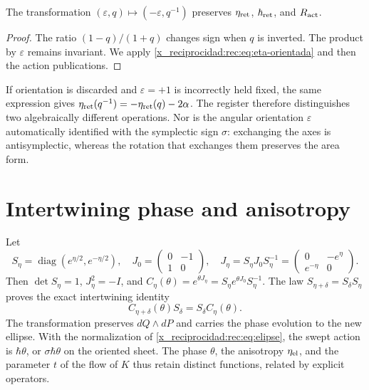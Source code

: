 \begin{corollary}
The transformation \((\varepsilon,q)\mapsto(-\varepsilon,q^{-1})\) preserves \(\eta_{\rm ret}\), \(\hbar_{\rm ret}\), and \(R_{\rm act}\).
\end{corollary}
\begin{proof}
The ratio \((1-q)/(1+q)\) changes sign when \(q\) is inverted. The product by \(\varepsilon\) remains invariant. We apply \eqref{x_reciprocidad:rec:eq:eta-orientada} and then the action publications.
\end{proof}

If orientation is discarded and \(\varepsilon=+1\) is incorrectly held fixed, the same expression gives \(\eta_{\rm ret}(q^{-1})=-\eta_{\rm ret}(q)-2\alpha\). The register therefore distinguishes two algebraically different operations. Nor is the angular orientation \(\varepsilon\) automatically identified with the symplectic sign \(\sigma\): exchanging the axes is antisymplectic, whereas the rotation that exchanges them preserves the area form.

\section{Intertwining phase and anisotropy}

Let
\[
 S_\eta=\operatorname{diag}(e^{\eta/2},e^{-\eta/2}),\quad
 J_0=\begin{pmatrix}0&-1\\1&0\end{pmatrix},\quad
 J_\eta=S_\eta J_0S_\eta^{-1}
       =\begin{pmatrix}0&-e^\eta\\e^{-\eta}&0\end{pmatrix}.
\]
Then \(\det S_\eta=1\), \(J_\eta^2=-I\), and
\(C_\eta(\theta)=e^{\theta J_\eta}=S_\eta e^{\theta J_0}S_\eta^{-1}\).
The law \(S_{\eta+\delta}=S_\delta S_\eta\) proves the exact intertwining identity
\begin{equation}
 C_{\eta+\delta}(\theta)S_\delta=S_\delta C_\eta(\theta).
 \label{x_reciprocidad:rec:eq:entrelazamiento}
\end{equation}
The transformation preserves \(dQ\wedge dP\) and carries the phase evolution to the new ellipse. With the normalization of \eqref{x_reciprocidad:rec:eq:elipse}, the swept action is \(\hbar\theta\), or \(\sigma\hbar\theta\) on the oriented sheet. The phase \(\theta\), the anisotropy \(\eta_{\rm el}\), and the parameter \(t\) of the flow of \(K\) thus retain distinct functions, related by explicit operators.


